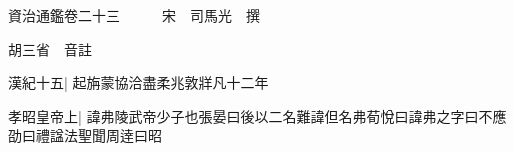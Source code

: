 






























































資治通鑑卷二十三　　　宋　司馬光　撰

胡三省　音註

漢紀十五|{
	起旃蒙協洽盡柔兆敦牂凡十二年}


孝昭皇帝上|{
	諱弗陵武帝少子也張晏曰後以二名難諱但名弗荀悅曰諱弗之字曰不應劭曰禮諡法聖聞周逹曰昭}


